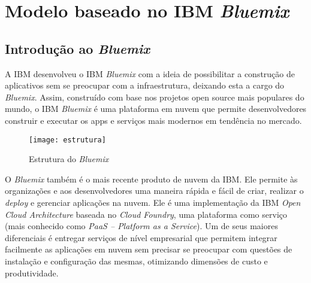 




\section{Modelo baseado no IBM \textit{Bluemix}}

\subsection{Introdução ao \textit{Bluemix}}

A IBM desenvolveu o IBM \textit{Bluemix} com a ideia de possibilitar a construção de aplicativos sem se preocupar com a infraestrutura, deixando esta a cargo do \textit{Bluemix}. Assim, construído com base nos projetos open source mais populares do mundo, o IBM \textit{Bluemix} é uma plataforma em nuvem que permite desenvolvedores construir e executar os apps e serviços mais modernos em tendência no mercado.

\begin{figure}[!htb]
  \centering
  \texttt{[image: estrutura]}
  \caption{Estrutura do \textit{Bluemix}}
  \label{Rotulo}
\end{figure}

O \textit{Bluemix} também é o mais recente produto de nuvem da IBM. Ele permite às organizações e aos desenvolvedores uma maneira rápida e fácil de criar, realizar o \textit{deploy} e gerenciar aplicações na nuvem. Ele é uma implementação da IBM \textit{Open Cloud Architecture} baseada no \textit{Cloud Foundry}, uma plataforma como serviço (mais conhecido como \textit{PaaS – Platform as a Service}). Um de seus maiores diferenciais é entregar serviços de nível empresarial que permitem integrar facilmente as aplicações em nuvem sem precisar se preocupar com questões de instalação e configuração das mesmas, otimizando dimensões de custo e produtividade.

